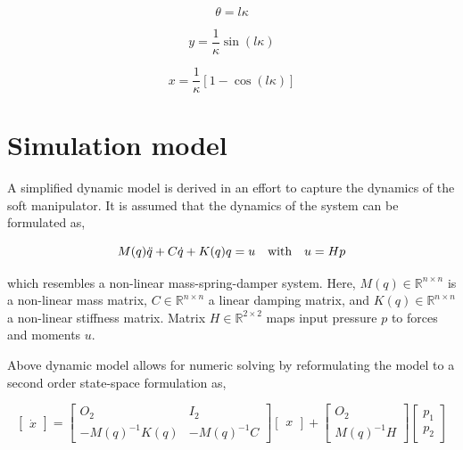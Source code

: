 \begin{equation}
    \theta = l \kappa
\end{equation}


\begin{equation}
    y = \frac{1}{\kappa}\sin(l \kappa)
\end{equation}

\begin{equation}
    x = \frac{1}{\kappa}[1-\cos(l \kappa)]
\end{equation}




\section{Simulation model}

A simplified dynamic model is derived in an effort to capture the dynamics of the soft manipulator. It is assumed that the dynamics of the system can be formulated as, 

\begin{equation}
    M(q)\Ddot{q} + C\dot{q} + K(q)q = u \hspace{10pt} \text{with} \hspace{10pt} u = Hp
\end{equation}

which resembles a non-linear mass-spring-damper system. Here, $M(q)  \in \mathbb{R}^{n\times n}$ is a non-linear mass matrix, $C   \in \mathbb{R}^{n\times n}$ a linear damping matrix, and $K(q)   \in \mathbb{R}^{n\times n}$ a non-linear stiffness matrix. Matrix $H   \in \mathbb{R}^{2\times 2}$ maps input pressure $p$ to forces and moments $u$.

Above dynamic model allows for numeric solving by reformulating the model to a second order state-space formulation as,

\begin{equation}
     \begin{bmatrix} \dot{x}  \end{bmatrix}   =      \begin{bmatrix} O_2 & I_2 \\ -M(q)^{-1}K(q)  & -M(q)^{-1} C \end{bmatrix}      \begin{bmatrix} x \end{bmatrix}  +      \begin{bmatrix} O_2 \\ M(q)^{-1}H   \end{bmatrix}       \begin{bmatrix} p_1\\ p_2   \end{bmatrix} 
\end{equation}

